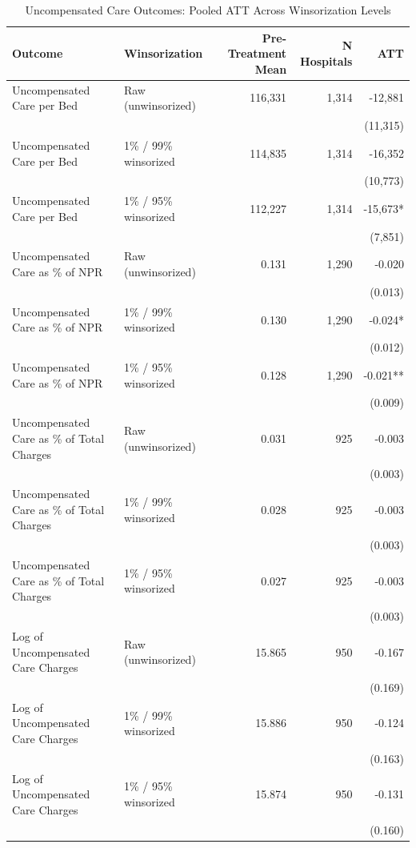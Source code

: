 \begin{table}[!h]
\centering
\caption{Uncompensated Care Outcomes: Pooled ATT Across Winsorization Levels}
\centering
\begin{tabular}[t]{llrrr}
\toprule
Outcome & Winsorization & Pre-Treatment Mean & N Hospitals & ATT\\
\midrule
Uncompensated Care per Bed & Raw (unwinsorized) & 116,331 & 1,314 & -12,881\\
 &  &  &  & (11,315)\\
Uncompensated Care per Bed & 1\% / 99\% winsorized & 114,835 & 1,314 & -16,352\\
 &  &  &  & (10,773)\\
Uncompensated Care per Bed & 1\% / 95\% winsorized & 112,227 & 1,314 & -15,673*\\
\addlinespace
 &  &  &  & (7,851)\\
Uncompensated Care as \% of NPR & Raw (unwinsorized) & 0.131 & 1,290 & -0.020\\
 &  &  &  & (0.013)\\
Uncompensated Care as \% of NPR & 1\% / 99\% winsorized & 0.130 & 1,290 & -0.024*\\
 &  &  &  & (0.012)\\
\addlinespace
Uncompensated Care as \% of NPR & 1\% / 95\% winsorized & 0.128 & 1,290 & -0.021**\\
 &  &  &  & (0.009)\\
Uncompensated Care as \% of Total Charges & Raw (unwinsorized) & 0.031 & 925 & -0.003\\
 &  &  &  & (0.003)\\
Uncompensated Care as \% of Total Charges & 1\% / 99\% winsorized & 0.028 & 925 & -0.003\\
\addlinespace
 &  &  &  & (0.003)\\
Uncompensated Care as \% of Total Charges & 1\% / 95\% winsorized & 0.027 & 925 & -0.003\\
 &  &  &  & (0.003)\\
Log of Uncompensated Care Charges & Raw (unwinsorized) & 15.865 & 950 & -0.167\\
 &  &  &  & (0.169)\\
\addlinespace
Log of Uncompensated Care Charges & 1\% / 99\% winsorized & 15.886 & 950 & -0.124\\
 &  &  &  & (0.163)\\
Log of Uncompensated Care Charges & 1\% / 95\% winsorized & 15.874 & 950 & -0.131\\
 &  &  &  & (0.160)\\

\end{tabular}
\end{table}
